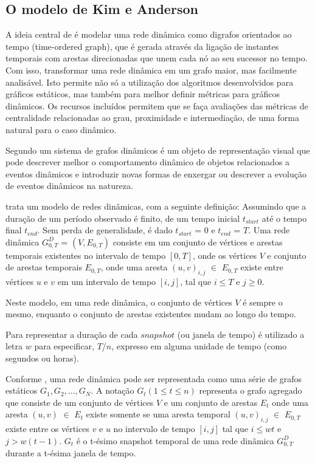 \subsection{O modelo de Kim e Anderson}
A ideia central de \cite{kim} é modelar uma rede dinâmica como digrafos orientados
ao tempo (time-ordered graph), que é gerada através da ligação de instantes temporais com arestas
direcionadas que unem cada nó ao seu sucessor no tempo. Com isso, transformar uma rede dinâmica
em um grafo maior, mas facilmente analisável. Isto permite não só a utilização dos algoritmos
desenvolvidos para gráficos estáticos, mas também para melhor definir métricas para
gráficos dinâmicos. Os recursos incluídos permitem que se faça avaliações das métricas
de centralidade relacionadas ao grau, proximidade e intermediação, de uma forma
natural para o caso dinâmico.

Segundo \cite{kim} um sistema de grafos dinâmicos é um objeto de representação visual que pode descrever
melhor o comportamento dinâmico de objetos relacionados a eventos dinâmicos e introduzir
novas formas de enxergar ou descrever a evolução de eventos dinâmicos na natureza.

\cite{kim} trata um modelo de redes dinâmicas, com a seguinte definição: Assumindo que a duração
de um período observado é finito, de um tempo inicial $t_{start}$ até o tempo final $t_{end}$. Sem perda de
generalidade, é dado $t_{start}$ = $0$ e $t_{end}$ = $T$. Uma rede dinâmica $G^D_{0,T}$ = $(V, E_{0,T})$ consiste
em um conjunto de vértices e arestas temporais existentes no intervalo de tempo $[0,T]$, onde
os vértices $V$ e conjunto de arestas temporais $E_{0,T}$, onde uma aresta $(u,v)_{i,j}$ $\in$ $E_{0,T}$
existe entre vértices $u$ e $v$ em um intervalo de tempo $[i,j]$, tal que $i \leqslant T$ e $j \geqslant 0$.

Neste modelo, em uma rede dinâmica, o conjunto de vértices $V$ é sempre o mesmo, enquanto o conjunto de arestas existentes
mudam ao longo do tempo.

Para representar a duração de cada $snapshot$ (ou janela de tempo) é utilizado a letra $w$ para especificar, $T$/$n$,
expresso em alguma unidade de tempo (como segundos ou horas).

Conforme \cite{kim}, uma rede dinâmica pode ser representada como uma série de grafos estáticos
$G_1, G_2, ..., G_N$. A notação $G_t(1 \leqslant t \leqslant n)$ representa o grafo agregado que consiste
de um conjunto de vértices $V$ e um conjunto de arestas $E_t$ onde uma aresta $(u,v)$ $\in$ $E_t$ existe
somente se uma aresta temporal $(u,v)_{i,j}$ $\in$ $E_{0,T}$ existe entre os vértices $v$ e $u$ no intervalo
de tempo $[i,j]$ tal que $i \leqslant wt$ e $j > w(t-1)$. $G_t$ é o t-ésimo snapshot temporal de uma
rede dinâmica $G^D_{0,T}$ durante a t-ésima janela de tempo.

